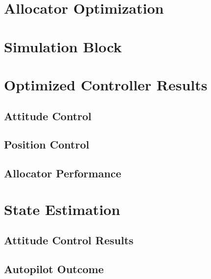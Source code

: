\section{Allocator Optimization}
\label{sec:simulation.allocator}
\section{Simulation Block}
\label{sec:simulation.block}
\section{Optimized Controller Results}
\label{sec:simulation.comparison}
\subsection{Attitude Control}
\label{subsec:simulation.comparison.attitude}
\subsection{Position Control}
\label{subsec:simulation.comparison.position}
\subsection{Allocator Performance}
\label{subsec:simulation.comparison.allocator}
\section{State Estimation}
\label{sec:simulation.state}
\subsection{Attitude Control Results}
\subsection{Autopilot Outcome}

